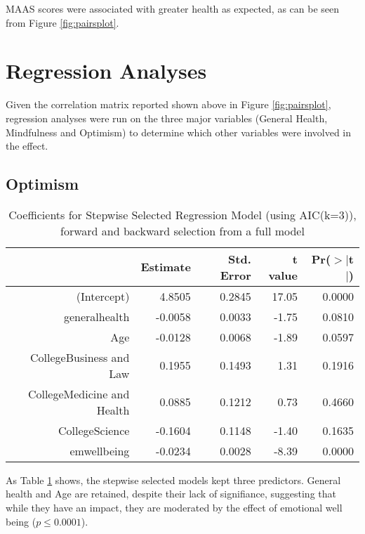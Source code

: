 \documentclass{article}
\begin{document}
MAAS scores were associated with greater health as expected, as can be seen from Figure \ref{fig:pairsplot}. 

\section{Regression Analyses}

Given the correlation matrix reported shown above in Figure \ref{fig:pairsplot},  regression analyses were run on the three major variables (General Health, Mindfulness and Optimism) to determine which other variables were involved in the effect.

\subsection{Optimism}





\begin{table}[ht]
\centering
\begin{tabular}{rrrrr}
  \hline
 & Estimate & Std. Error & t value & Pr($>$$|$t$|$) \\ 
  \hline
(Intercept) & 4.8505 & 0.2845 & 17.05 & 0.0000 \\ 
  generalhealth & -0.0058 & 0.0033 & -1.75 & 0.0810 \\ 
  Age & -0.0128 & 0.0068 & -1.89 & 0.0597 \\ 
  CollegeBusiness and Law & 0.1955 & 0.1493 & 1.31 & 0.1916 \\ 
  CollegeMedicine and Health & 0.0885 & 0.1212 & 0.73 & 0.4660 \\ 
  CollegeScience & -0.1604 & 0.1148 & -1.40 & 0.1635 \\ 
  emwellbeing & -0.0234 & 0.0028 & -8.39 & 0.0000 \\ 
   \hline
\end{tabular}
\caption{Coefficients for Stepwise Selected Regression Model (using AIC(k=3)), forward and backward selection from a full model} 
\label{tab:hom1optstep}
\end{table}
As Table \ref{tab:hom1optstep} shows, the stepwise selected models kept three predictors. General health and Age are retained, despite their lack of signifiance, suggesting that while they have an impact, they are moderated by the effect of emotional well being ($ p \le 0.0001$). 
\end{document}
